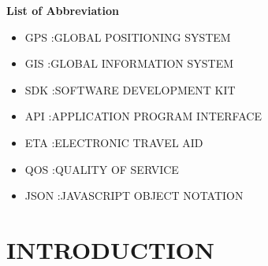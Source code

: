 \documentclass[11pt,a4paper,twoside]{report}
\begin{document}
 
\setcounter{page}{0}
\tableofcontents
\listoffigures
\newpage
\begin{LARGE}
\textbf{List of Abbreviation}
\end{LARGE}
\begin{small}


\begin{itemize}
\item GPS \hspace{4mm}  :GLOBAL POSITIONING SYSTEM
\item GIS \hspace{5mm} :GLOBAL INFORMATION SYSTEM
\item SDK \hspace{3.6mm} :SOFTWARE DEVELOPMENT KIT
\item API  \hspace{6mm}:APPLICATION PROGRAM INTERFACE
\item ETA \hspace{3.6mm} :ELECTRONIC TRAVEL AID
\item QOS  \hspace{4.7mm}:QUALITY OF SERVICE
\item JSON \hspace{3mm}:JAVASCRIPT OBJECT NOTATION
\end{itemize}
\end{small}




\chapter{INTRODUCTION}

\pagestyle{fancy}
\rhead{\thepage}
\chead{}

\cfoot{}
\rfoot{}
\renewcommand{\headrulewidth}{0.4pt}
\renewcommand{\footrulewidth}{0.4pt}
\end{document}

